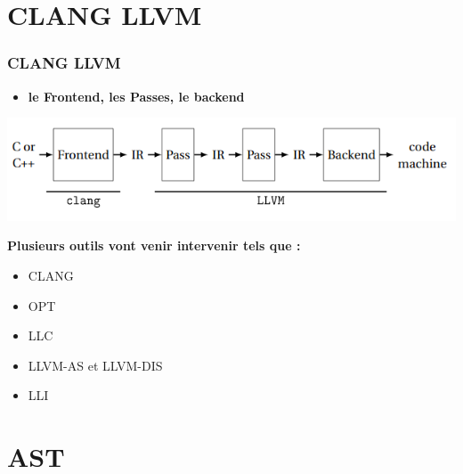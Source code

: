 \documentclass[hyperref={bookmarks=false},aspectratio=169]{beamer}
\begin{document}
\section{CLANG LLVM}



\begin{frame}
\frametitle{CLANG LLVM}

\begin{itemize}
    \item \textbf{le Frontend, les Passes, le backend}
\end{itemize}


\vfill
\begin{center} \includegraphics[scale=0.3]{./figures/ll.png} \end{center}
\vfill
\textbf{Plusieurs outils vont venir intervenir tels que :}\\[0.3cm]

\begin{itemize}
    \item CLANG
    \item OPT
    \item LLC
    \item LLVM-AS et LLVM-DIS
    \item LLI
\end{itemize}


\end{frame}

\section{AST}

\end{document}
